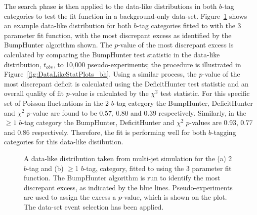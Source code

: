 The search phase is then applied to the data-like distributions
in both $b$-tag categories 
to test the fit function in a background-only data-set.
Figure~\ref{fig:DataLikeSearchPhase} shows an example data-like distribution for both $b$-tag categories fitted
to with the 3 parameter fit function,
with the most discrepant excess as identified by the BumpHunter algorithm shown.
The \mbox{$p$-value} of the most discrepant excess is calculated by comparing the BumpHunter test statistic in the data-like distribution, $t_{obs}$,
to 10,000 pseudo-experiments; the procedure is illustrated in Figure~\ref{fig:DataLikeStatPlots_bh}.
Using a similar process, the \mbox{$p$-value} of the most discrepant deficit is calculated using the DeficitHunter test statistic
and an overall quality of fit \mbox{$p$-value} is calculated by the $\chi^{2}$ test statistic.
For this specific set of Poisson fluctuations in the 2 $b$-tag category
the BumpHunter, DeficitHunter and  $\chi^{2}$ \mbox{$p$-value} are found to be
0.57, 0.80 and 0.39 respectively.
Similarly, in the $\geq1$ $b$-tag category the
BumpHunter, DeficitHunter and  $\chi^{2}$ \mbox{$p$-value}s are
0.93, 0.77 and 0.86 respectively.
Therefore, the fit is performing well for both $b$-tagging categories for this data-like distibution.

\begin{figure}[!ht]
  \begin{center}
   \captionsetup[subfigure]{aboveskip=0pt,justification=centering}
  \end{center}
  \caption{A data-like distribution taken from multi-jet simulation for the (a) 2 $b$-tag and (b) $\geq$1 $b$-tag,
    category, fitted to using the 3 parameter fit function.
    The BumpHunter algorithm is run to identify the most discrepant excess, as indicated by the blue lines.
    Pseudo-experiments are used to assign the excess a \mbox{$p$-value}, which is shown on the plot.
    The \summer{} data-set event selection has been applied.}
  \label{fig:DataLikeSearchPhase}
\end{figure}

